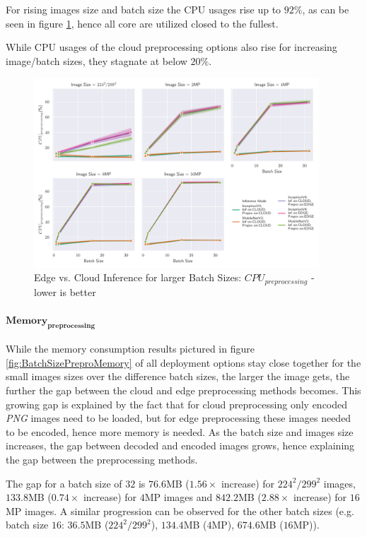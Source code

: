 For rising images size and batch size the CPU usages rise up to $92\%$, as can be seen in figure \ref{fig:BatchSizePreproCPU}, hence all core are utilized closed to the fullest.


While CPU usages of the cloud preprocessing options also rise for increasing image/batch sizes, they stagnate at below $20\%$.
\begin{figure}[!htb]
\centering
\includegraphics[width=0.95\textwidth]{./Bilder/single_plots/batch_size_plots/Effects_of_Batch_size_Preprocessing_CPU_Usage.pdf}
\caption{Edge vs. Cloud Inference for larger Batch Sizes:  $CPU_{preprocessing}$ - lower is better}
\label{fig:BatchSizePreproCPU}
\end{figure}

\paragraph{$\mathbf{Memory_{preprocessing}}$}
While the memory consumption results pictured in figure \ref{fig:BatchSizePreproMemory} of all deployment options stay close together for the small images sizes over the difference batch sizes, the larger the image gets, the further the gap between the cloud and edge preprocessing methods becomes.
This growing gap is explained by the fact that for cloud preprocessing only encoded \emph{PNG} images need to be loaded, but for edge preprocessing these images needed to be encoded, hence more memory is needed.
As the batch size and images size increases, the gap between decoded and encoded images grows, hence explaining the gap between the preprocessing methods.

The gap for a batch size of $32$ is $76.6$MB ($1.56\times$ increase) for $224^2/299^2$ images, $133.8$MB ($0.74\times$ increase) for $4$MP images and $842.2$MB ($2.88\times$ increase) for $16$MP images. 
A similar progression can be observed for the other batch sizes (e.g. batch size $16$: $36.5$MB ($224^2/299^2$), $134.4$MB ($4$MP), $674.6$MB ($16$MP)).

